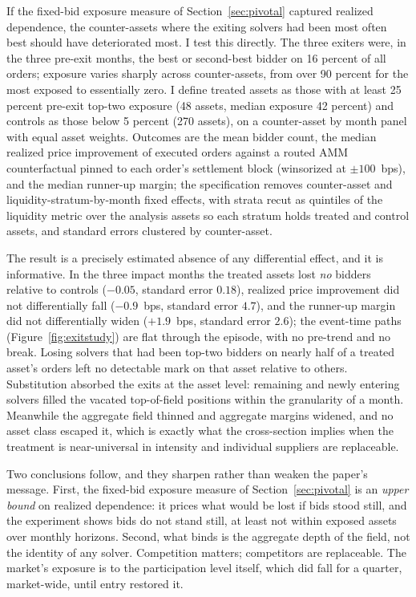 \documentclass[11pt]{article}
\theoremstyle{plain}
\theoremstyle{definition}
\theoremstyle{remark}
\begin{document}
If the fixed-bid exposure measure of Section~\ref{sec:pivotal} captured realized dependence, the counter-assets where the exiting solvers had been most often best should have deteriorated most. I test this directly. The three exiters were, in the three pre-exit months, the best or second-best bidder on 16 percent of all orders; exposure varies sharply across counter-assets, from over 90 percent for the most exposed to essentially zero. I define treated assets as those with at least 25 percent pre-exit top-two exposure (48 assets, median exposure 42 percent) and controls as those below 5 percent (270 assets), on a counter-asset by month panel with equal asset weights. Outcomes are the mean bidder count, the median realized price improvement of executed orders against a routed AMM counterfactual pinned to each order's settlement block (winsorized at $\pm 100$~bps), and the median runner-up margin; the specification removes counter-asset and liquidity-stratum-by-month fixed effects, with strata recut as quintiles of the liquidity metric over the analysis assets so each stratum holds treated and control assets, and standard errors clustered by counter-asset.

The result is a precisely estimated absence of any differential effect, and it is informative. In the three impact months the treated assets lost \emph{no} bidders relative to controls ($-0.05$, standard error $0.18$), realized price improvement did not differentially fall ($-0.9$~bps, standard error $4.7$), and the runner-up margin did not differentially widen ($+1.9$~bps, standard error $2.6$); the event-time paths (Figure~\ref{fig:exitstudy}) are flat through the episode, with no pre-trend and no break. Losing solvers that had been top-two bidders on nearly half of a treated asset's orders left no detectable mark on that asset relative to others. Substitution absorbed the exits at the asset level: remaining and newly entering solvers filled the vacated top-of-field positions within the granularity of a month. Meanwhile the aggregate field thinned and aggregate margins widened, and no asset class escaped it, which is exactly what the cross-section implies when the treatment is near-universal in intensity and individual suppliers are replaceable.

Two conclusions follow, and they sharpen rather than weaken the paper's message. First, the fixed-bid exposure measure of Section~\ref{sec:pivotal} is an \emph{upper bound} on realized dependence: it prices what would be lost if bids stood still, and the experiment shows bids do not stand still, at least not within exposed assets over monthly horizons. Second, what binds is the aggregate depth of the field, not the identity of any solver. Competition matters; competitors are replaceable. The market's exposure is to the participation level itself, which did fall for a quarter, market-wide, until entry restored it.
\end{document}
